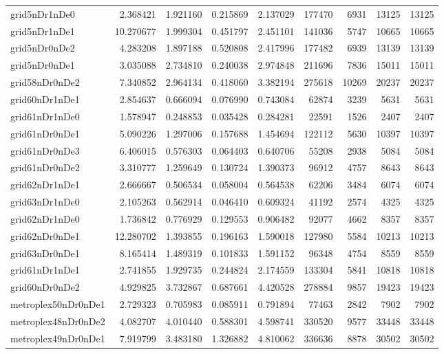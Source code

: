 \begin{longtable}{|l|r|r|r|r|r|r|r|r|}
grid5nDr1nDe0 & 2.368421 & 1.921160 & 0.215869 & 2.137029 & 177470 & 6931 & 13125 & 13125 \\
grid5nDr1nDe1 & 10.270677 & 1.999304 & 0.451797 & 2.451101 & 141036 & 5747 & 10665 & 10665 \\
grid5nDr0nDe2 & 4.283208 & 1.897188 & 0.520808 & 2.417996 & 177482 & 6939 & 13139 & 13139 \\
grid5nDr0nDe1 & 3.035088 & 2.734810 & 0.240038 & 2.974848 & 211696 & 7836 & 15011 & 15011 \\
grid58nDr0nDe2 & 7.340852 & 2.964134 & 0.418060 & 3.382194 & 275618 & 10269 & 20237 & 20237 \\
grid60nDr1nDe1 & 2.854637 & 0.666094 & 0.076990 & 0.743084 & 62874 & 3239 & 5631 & 5631 \\
grid61nDr1nDe0 & 1.578947 & 0.248853 & 0.035428 & 0.284281 & 22591 & 1526 & 2407 & 2407 \\
grid61nDr0nDe1 & 5.090226 & 1.297006 & 0.157688 & 1.454694 & 122112 & 5630 & 10397 & 10397 \\
grid61nDr0nDe3 & 6.406015 & 0.576303 & 0.064403 & 0.640706 & 55208 & 2938 & 5084 & 5084 \\
grid61nDr0nDe2 & 3.310777 & 1.259649 & 0.130724 & 1.390373 & 96912 & 4757 & 8643 & 8643 \\
grid62nDr1nDe1 & 2.666667 & 0.506534 & 0.058004 & 0.564538 & 62206 & 3484 & 6074 & 6074 \\
grid63nDr1nDe0 & 2.105263 & 0.562914 & 0.046410 & 0.609324 & 41192 & 2574 & 4325 & 4325 \\
grid62nDr1nDe0 & 1.736842 & 0.776929 & 0.129553 & 0.906482 & 92077 & 4662 & 8357 & 8357 \\
grid62nDr0nDe1 & 12.280702 & 1.393855 & 0.196163 & 1.590018 & 127980 & 5584 & 10213 & 10213 \\
grid63nDr0nDe1 & 8.165414 & 1.489319 & 0.101833 & 1.591152 & 96348 & 4754 & 8559 & 8559 \\
grid61nDr1nDe1 & 2.741855 & 1.929735 & 0.244824 & 2.174559 & 133304 & 5841 & 10818 & 10818 \\
grid60nDr0nDe2 & 4.929825 & 3.732867 & 0.687661 & 4.420528 & 278884 & 9857 & 19423 & 19423 \\
metroplex50nDr0nDe1 & 2.729323 & 0.705983 & 0.085911 & 0.791894 & 77463 & 2842 & 7902 & 7902 \\
metroplex48nDr0nDe2 & 4.082707 & 4.010440 & 0.588301 & 4.598741 & 330520 & 9577 & 33448 & 33448 \\
metroplex49nDr0nDe1 & 7.919799 & 3.483180 & 1.326882 & 4.810062 & 336636 & 8878 & 30502 & 30502 \\

\end{longtable}
